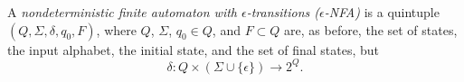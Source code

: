 

\setcounter{section}{1}
\setcounter{subsection}{4}
\setcounter{dfn}{11}

\begin{dfn}
\label{dfn:ENFA}
A \emph{nondeterministic finite automaton with $\epsilon$-transitions ($\epsilon$-NFA)}
is a quintuple $(Q, \Sigma, \delta, q_0, F)$, where $Q$, $\Sigma$, $q_0 \in Q$, and $F \subset Q$
are, as before, the set of states, the input alphabet, the initial state, and the set of final states,
but
\[
\delta \colon Q \times (\Sigma \cup \{\epsilon\}) \to 2^Q.
\]
\end{dfn}


